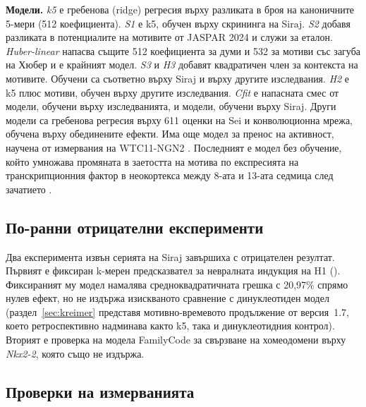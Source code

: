 \documentclass[10.5pt,a4paper]{article}
\begin{document}
\textbf{Модели.} \emph{k5} е гребенова (ridge) регресия върху разликата в броя на каноничните 5-мери (512 коефициента). \emph{S1} е k5, обучен върху скрининга на Siraj. \emph{S2} добавя разликата в потенциалите на мотивите от JASPAR 2024 \citep{rauluseviciute2024} и служи за еталон. \emph{Huber-linear} напасва същите 512 коефициента за думи и 532 за мотиви със загуба на Хюбер и е крайният модел. \emph{S3} и \emph{H3} добавят квадратичен член за контекста на мотивите. Обучени са съответно върху Siraj и върху другите изследвания. \emph{H2} е k5 плюс мотиви, обучен върху другите изследвания. \emph{Cfit} е напасната смес от модели, обучени върху изследванията, и модели, обучени върху Siraj. Други модели са гребенова регресия върху 611 оценки на Sei \citep{chen2022} и конволюционна мрежа, обучена върху обединените ефекти. Има още модел за пренос на активност, научена от измервания на WTC11-NGN2 \citep[вдъхновен от][]{seitz2024,tareen2022}. Последният е модел без обучение, който умножава промяната в заетостта на мотива по експресията на транскрипционния фактор в неокортекса между 8-ата и 13-ата седмица след зачатието \citep{kang2011,miller2014}.

\subsection{По-ранни отрицателни експерименти}

Два експеримента извън серията на Siraj завършиха с отрицателен резултат. Първият е фиксиран k-мерен предсказвател за невралната индукция на H1 (). Фиксираният му модел намалява средноквадратичната грешка с 20,97\% спрямо нулев ефект, но не издържа изискваното сравнение с динуклеотиден модел (раздел~\ref{sec:kreimer} представя мотивно-времевото продължение от версия~1.7, което ретроспективно надминава както k5, така и динуклеотидния контрол). Вторият е проверка на модела FamilyCode за свързване на хомеодомени \citep{liu2025} върху \emph{Nkx2-2}, която също не издържа.

\subsection{Проверки на измерванията}
\end{document}
